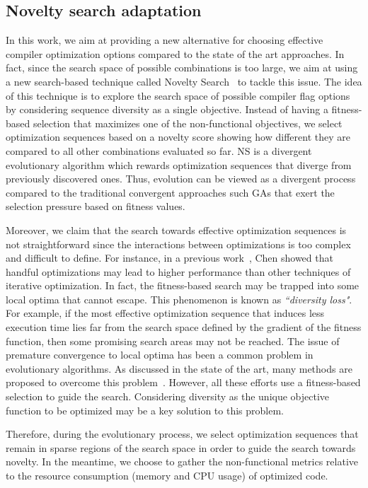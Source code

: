 \subsection{Novelty search adaptation}
\label{sec:adapNS}

In this work, we aim at providing a new alternative for choosing effective compiler optimization options compared to the state of the art approaches. 
In fact, since the search space of possible combinations is too large, we aim at using a new search-based technique called Novelty Search~\cite{lehman2008exploiting} to tackle this issue. 
The idea of this technique is to explore the search space of possible compiler flag options by considering sequence diversity as a single objective. 
Instead of having a fitness-based selection that maximizes one of the non-functional objectives, we select optimization sequences based on a novelty score showing how different they are compared to all other combinations evaluated so far. 
NS is a divergent evolutionary algorithm which rewards optimization sequences that diverge from previously discovered ones. Thus, evolution can be viewed as a divergent process compared to the traditional convergent approaches such GAs that exert the selection pressure based on fitness values.

Moreover, we claim that the search towards effective optimization sequences is not straightforward since the interactions between optimizations is too complex and difficult to define. 
For instance, in a previous work~\cite{chen2012deconstructing}, Chen \etal showed that handful optimizations may lead to higher performance than other techniques of iterative optimization. 
In fact, the fitness-based search may be trapped into some local optima that cannot escape\cite{bodin1998iterative}. 
This phenomenon is known as \textit{``diversity loss"}. For example, if the most effective optimization sequence that induces less execution time lies far from the search space defined by the gradient of the fitness function, then some promising search areas may not be reached. 
The issue of premature convergence to local optima has been a common problem in evolutionary algorithms. 
As discussed in the state of the art, many methods are proposed to overcome this problem~\cite{banzhaf1996effect}. However, all these efforts use a fitness-based selection to guide the search. Considering diversity as the unique objective function to be optimized may be a key solution to this problem.

Therefore, during the evolutionary process, we select optimization sequences that remain in sparse regions of the search space in order to guide the search towards novelty. 
In the meantime, we choose to gather the non-functional metrics relative to the resource consumption (memory and CPU usage) of optimized code. 


